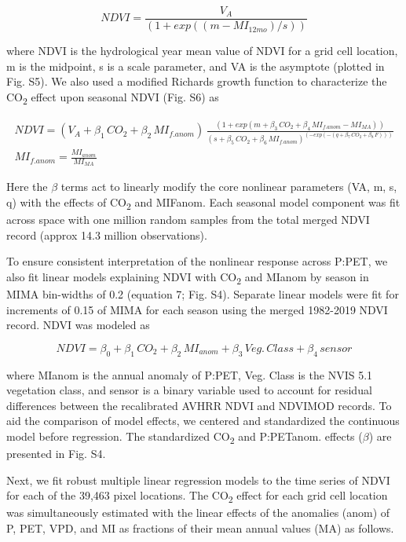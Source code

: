 \documentclass[gc, manuscript]{copernicus}
\begin{document}
\begin{equation}
NDVI = \frac{V_A}{(1+exp((m-MI_{12mo})/s))}
\end{equation}

where NDVI is the hydrological year mean value of NDVI for a grid cell
location, m is the midpoint, s is a scale parameter, and VA is the
asymptote (plotted in Fig. S5). We also used a modified Richards growth
function to characterize the CO\textsubscript{2} effect upon seasonal
NDVI (Fig. S6) as

\begin{align}
NDVI=(V_A+\beta_1\,CO_2+\beta_2\,MI_{f.anom})\,\frac{(1+exp(m+\beta_3\,CO_2+\beta_4\,MI_{f.anom} - MI_{MA}))}{(s+\beta_5\,CO_2+\beta_6\,MI_{f.anom})^{(-exp(-(q+\beta_7\,CO_2+\beta_8\,F)))}}\\
MI_{f.anom} = \frac{MI_{anom}}{MI_{MA}}\nonumber
\end{align}

Here the \(\beta\) terms act to linearly modify the core nonlinear
parameters (VA, m, s, q) with the effects of CO\textsubscript{2} and
MIFanom. Each seasonal model component was fit across space with one
million random samples from the total merged NDVI record (approx 14.3
million observations).

To ensure consistent interpretation of the nonlinear response across
P:PET, we also fit linear models explaining NDVI with
CO\textsubscript{2} and MIanom by season in MIMA bin-widths of 0.2
(equation 7; Fig. S4). Separate linear models were fit for increments of
0.15 of MIMA for each season using the merged 1982-2019 NDVI record.
NDVI was modeled as

\begin{equation}
NDVI = \beta_0+\beta_1\,CO_2 + \beta_2\,MI_{anom}+\beta_3\,Veg.\,Class+\beta_4\,sensor
\end{equation}

where MIanom is the annual anomaly of P:PET, Veg. Class is the NVIS 5.1
vegetation class, and sensor is a binary variable used to account for
residual differences between the recalibrated AVHRR NDVI and NDVIMOD
records. To aid the comparison of model effects, we centered and
standardized the continuous model before regression. The standardized
CO\textsubscript{2} and P:PETanom. effects (\(\beta\)) are presented in
Fig. S4.

Next, we fit robust multiple linear regression models to the time series
of NDVI for each of the 39,463 pixel locations. The CO\textsubscript{2}
effect for each grid cell location was simultaneously estimated with the
linear effects of the anomalies (anom) of P, PET, VPD, and MI as
fractions of their mean annual values (MA) as follows.
\end{document}
